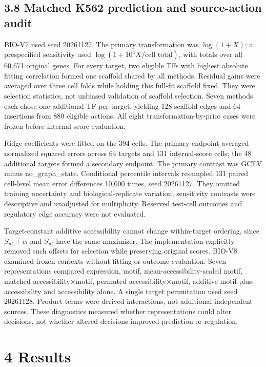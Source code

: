 \documentclass[
  11pt,
]{article}
\begin{document}
\subsection{3.8 Matched K562 prediction and source-action
audit}\label{matched-k562-prediction-and-source-action-audit}

BIO-V7 used seed 20261127. The primary transformation was \(\log(1+X)\);
a prespecified sensitivity used \(\log(1+10^4X/\text{cell total})\),
with totals over all 60,671 original genes. For every target, two
eligible TFs with highest absolute fitting correlation formed one
scaffold shared by all methods. Residual gains were averaged over three
cell folds while holding this full-fit scaffold fixed. They were
selection statistics, not unbiased validation of scaffold selection.
Seven methods each chose one additional TF per target, yielding 128
scaffold edges and 64 insertions from 880 eligible actions. All eight
transformation-by-prior cases were frozen before internal-score
evaluation.

Ridge coefficients were fitted on the 394 cells. The primary endpoint
averaged normalized squared errors across 64 targets and 131
internal-score cells; the 48 additional targets formed a secondary
endpoint. The primary contrast was GCEV minus no\_graph\_state.
Conditional percentile intervals resampled 131 paired cell-level mean
error differences 10,000 times, seed 20261127. They omitted training
uncertainty and biological-replicate variation; sensitivity contrasts
were descriptive and unadjusted for multiplicity. Reserved test-cell
outcomes and regulatory edge accuracy were not evaluated.

Target-constant additive accessibility cannot change within-target
ordering, since \(S_{ut}+c_t\) and \(S_{ut}\) have the same maximizer.
The implementation explicitly removed such offsets for selection while
preserving original scores. BIO-V8 examined frozen contexts without
fitting or outcome evaluation. Seven representations compared
expression, motif, mean-accessibility-scaled motif, matched
accessibility×motif, permuted accessibility×motif, additive
motif-plus-accessibility and accessibility alone. A single target
permutation used seed 20261128. Product terms were derived interactions,
not additional independent sources. These diagnostics measured whether
representations could alter decisions, not whether altered decisions
improved prediction or regulation.

\section{4 Results}\label{results}
\end{document}
